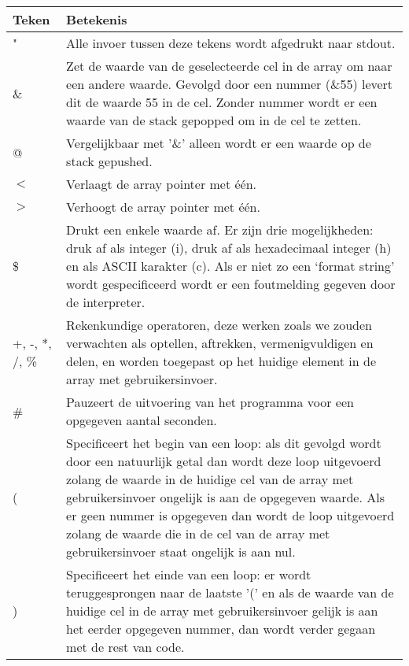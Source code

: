 \documentclass[11pt]{article}
\begin{document}
\begin{center}
    \begin{tabular}{ | l | p{15cm} |}
    \hline
    Teken & Betekenis \\ \hline
    " & Alle invoer tussen deze tekens wordt afgedrukt naar stdout. \\ \hline
    \& & Zet de waarde van de geselecteerde cel in de array om naar een andere waarde. Gevolgd door een nummer (\&55) levert dit de waarde 55 in de cel. Zonder nummer wordt er een waarde van de stack gepopped om in de cel te zetten. \\ \hline
    @ & Vergelijkbaar met '\&' alleen wordt er een waarde op de stack gepushed. \\ \hline
    \(<\) & Verlaagt de array pointer met \'e\'en. \\ \hline
    \(>\) & Verhoogt de array pointer met \'e\'en. \\ \hline
    \$ & Drukt een enkele waarde af. Er zijn drie mogelijkheden: druk af als integer (i), druk af als hexadecimaal integer (h) en als ASCII karakter (c). Als er niet zo een `format string' wordt gespecificeerd wordt er een foutmelding gegeven door de interpreter. \\ \hline
    +, -, *, /, \% & Rekenkundige operatoren, deze werken zoals we zouden verwachten als optellen, aftrekken, vermenigvuldigen en delen, en worden toegepast op het huidige element in de array met gebruikersinvoer. \\ \hline
    \# & Pauzeert de uitvoering van het programma voor een opgegeven aantal seconden. \\ \hline
    ( & Specificeert het begin van een loop: als dit gevolgd wordt door een natuurlijk getal dan wordt deze loop uitgevoerd zolang de waarde in de huidige cel van de array met gebruikersinvoer ongelijk is aan de opgegeven waarde. Als er geen nummer is opgegeven dan wordt de loop uitgevoerd zolang de waarde die in de cel van de array met gebruikersinvoer staat ongelijk is aan nul. \\ \hline
    ) & Specificeert het einde van een loop: er wordt teruggesprongen naar de laatste '(' en als de waarde van de huidige cel in de array met gebruikersinvoer gelijk is aan het eerder opgegeven nummer, dan wordt verder gegaan met de rest van code. \\ \hline
  

    \hline
    \end{tabular}
\end{center}
\end{document}
